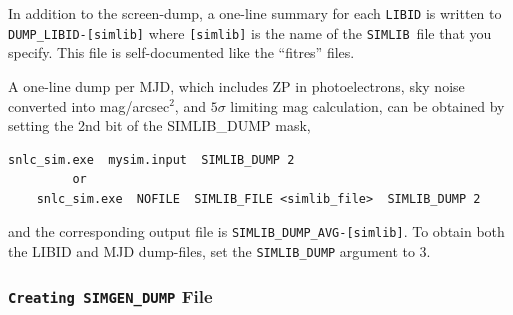 \documentclass[12pt]{article}
\newcommand{\simlib}{{\tt SIMLIB}}
\begin{document}
In addition to the screen-dump, a one-line summary for each 
{\tt LIBID} is written to {\tt DUMP\_LIBID-[simlib]} where
{\tt [simlib]} is the name of the \simlib\ file that you
specify.
This file is self-documented like the ``fitres'' files.


A one-line dump per MJD, which includes ZP in photoelectrons,
sky noise converted into mag/arcsec$^2$, and $5\sigma$ limiting
mag calculation, can be obtained by setting the 2nd bit
of the SIMLIB\_DUMP mask,
%
\begin{Verbatim}[frame=single]
    snlc_sim.exe  mysim.input  SIMLIB_DUMP 2
         or
    snlc_sim.exe  NOFILE  SIMLIB_FILE <simlib_file>  SIMLIB_DUMP 2
\end{Verbatim}
and the corresponding output file is 
{\tt SIMLIB\_DUMP\_AVG-[simlib]}. To obtain both the LIBID and MJD
dump-files, set the {\tt SIMLIB\_DUMP} argument to 3.





   \subsubsection{{\tt Creating SIMGEN\_DUMP} File }
   \label{sss:simgen_dump}
\end{document}
